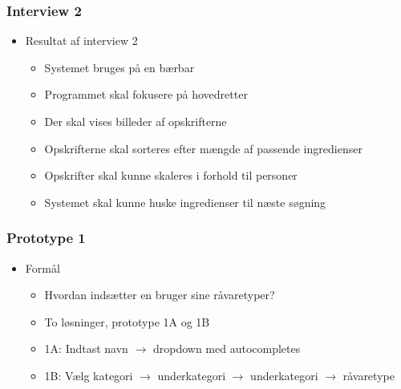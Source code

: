 \begin{frame}
\frametitle{Interview 2}
	\begin{itemize}
	\item Resultat af interview 2
			\begin{itemize}
			\item Systemet bruges på en bærbar
			\item Programmet skal fokusere på hovedretter
			\item Der skal vises billeder af opskrifterne
			\item Opskrifterne skal sorteres efter mængde af passende ingredienser
			\item Opskrifter skal kunne skaleres i forhold til personer
			\item Systemet skal kunne huske ingredienser til næste søgning
			\end{itemize} 
	\end{itemize}
\end{frame}

\begin{frame}
\frametitle{Prototype 1}
	\begin{itemize}
	\item Formål
			\begin{itemize}
			\item Hvordan indsætter en bruger sine råvaretyper?
			\item To løsninger, prototype 1A og 1B
			\item 1A: Indtast navn $\rightarrow$ dropdown med autocompletes
			\item 1B: Vælg kategori $\rightarrow$ underkategori $\rightarrow$ underkategori $\rightarrow$ råvaretype
			\end{itemize} 
	\end{itemize}
\end{frame}


